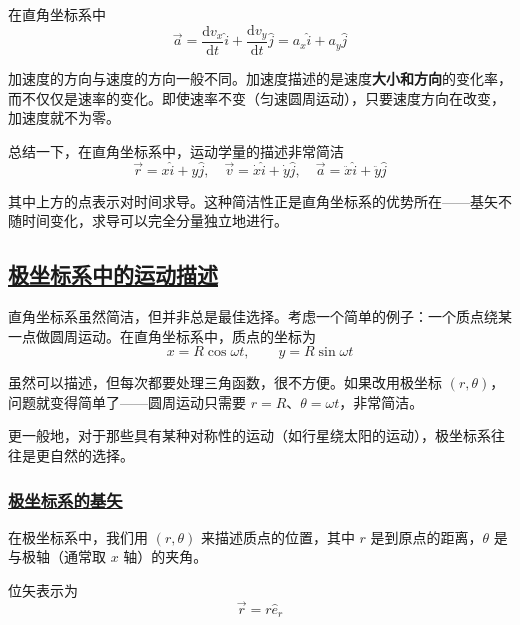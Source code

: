 在直角坐标系中
\begin{equation}
    \vec{a} = \frac{\mathrm{d}v_x}{\mathrm{d}t}\hat{i} + \frac{\mathrm{d}v_y}{\mathrm{d}t}\hat{j} = a_x\hat{i} + a_y\hat{j}
\end{equation}

\begin{remark}
    加速度的方向与速度的方向一般不同。加速度描述的是速度\textbf{大小和方向}的变化率，而不仅仅是速率的变化。即使速率不变（匀速圆周运动），只要速度方向在改变，加速度就不为零。
\end{remark}

总结一下，在直角坐标系中，运动学量的描述非常简洁
\begin{equation}
    \boxed{
        \vec{r} = x\hat{i} + y\hat{j}, \quad
        \vec{v} = \dot{x}\hat{i} + \dot{y}\hat{j}, \quad
        \vec{a} = \ddot{x}\hat{i} + \ddot{y}\hat{j}
    }
\end{equation}

其中上方的点表示对时间求导。这种简洁性正是直角坐标系的优势所在——基矢不随时间变化，求导可以完全分量独立地进行。

\subsection{\protect\hyperlink{:}{极坐标系中的运动描述}}

直角坐标系虽然简洁，但并非总是最佳选择。考虑一个简单的例子：一个质点绕某一点做圆周运动。在直角坐标系中，质点的坐标为
\begin{equation}
    x = R\cos\omega t, \qquad y = R\sin\omega t
\end{equation}

虽然可以描述，但每次都要处理三角函数，很不方便。如果改用极坐标 $(r, \theta)$，问题就变得简单了——圆周运动只需要 $r = R$、$\theta = \omega t$，非常简洁。

更一般地，对于那些具有某种对称性的运动（如行星绕太阳的运动），极坐标系往往是更自然的选择。

\subsubsection{\protect\hyperlink{:}{极坐标系的基矢}}

在极坐标系中，我们用 $(r, \theta)$ 来描述质点的位置，其中 $r$ 是到原点的距离，$\theta$ 是与极轴（通常取 $x$ 轴）的夹角。

位矢表示为
\begin{equation}
    \vec{r} = r\hat{e}_r
\end{equation}


